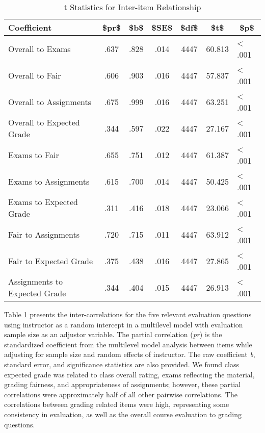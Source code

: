 \documentclass[man]{apa6}
\theoremstyle{definition}
\theoremstyle{definition}
\theoremstyle{definition}
\theoremstyle{remark}
\begin{document}
\begin{table}[tbp]
\begin{center}
\begin{threeparttable}
\caption{\label{tab:correlation-table}t Statistics for Inter-item Relationship}
\begin{tabular}{lcccccl}
\toprule
Coefficient & \multicolumn{1}{c}{\$pr\$} & \multicolumn{1}{c}{\$b\$} & \multicolumn{1}{c}{\$SE\$} & \multicolumn{1}{c}{\$df\$} & \multicolumn{1}{c}{\$t\$} & \multicolumn{1}{c}{\$p\$}\\
\midrule
Overall to Exams & .637 & .828 & .014 & 4447 & 60.813 & < .001\\
Overall to Fair & .606 & .903 & .016 & 4447 & 57.837 & < .001\\
Overall to Assignments & .675 & .999 & .016 & 4447 & 63.251 & < .001\\
Overall to Expected Grade & .344 & .597 & .022 & 4447 & 27.167 & < .001\\
Exams to Fair & .655 & .751 & .012 & 4447 & 61.387 & < .001\\
Exams to Assignments & .615 & .700 & .014 & 4447 & 50.425 & < .001\\
Exams to Expected Grade & .311 & .416 & .018 & 4447 & 23.066 & < .001\\
Fair to Assignments & .720 & .715 & .011 & 4447 & 63.912 & < .001\\
Fair to Expected Grade & .375 & .438 & .016 & 4447 & 27.865 & < .001\\
Assignments to Expected Grade & .344 & .404 & .015 & 4447 & 26.913 & < .001\\
\bottomrule
\end{tabular}
\end{threeparttable}
\end{center}
\end{table}

Table \ref{tab:correlation-table} presents the inter-correlations for
the five relevant evaluation questions using instructor as a random
intercept in a multilevel model with evaluation sample size as an
adjustor variable. The partial correlation (\emph{pr}) is the
standardized coefficient from the multilevel model analysis between
items while adjusting for sample size and random effects of instructor.
The raw coefficient \emph{b}, standard error, and significance
statistics are also provided. We found class expected grade was related
to class overall rating, exams reflecting the material, grading
fairness, and appropriateness of assignments; however, these partial
correlations were approximately half of all other pairwise correlations.
The correlations between grading related items were high, representing
some consistency in evaluation, as well as the overall course evaluation
to grading questions.
\end{document}
